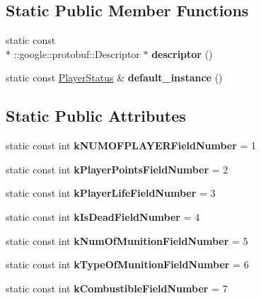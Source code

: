 \subsection*{Static Public Member Functions}
\begin{DoxyCompactItemize}
\item 
\hypertarget{class_player_status_ab7af70a3b8976e2a2971f67dd88d2ee0}{static const \\*
\-::google\-::protobuf\-::\-Descriptor $\ast$ {\bfseries descriptor} ()}\label{class_player_status_ab7af70a3b8976e2a2971f67dd88d2ee0}

\item 
\hypertarget{class_player_status_a48e587242903b11af6171a3307bdac91}{static const \hyperlink{class_player_status}{Player\-Status} \& {\bfseries default\-\_\-instance} ()}\label{class_player_status_a48e587242903b11af6171a3307bdac91}

\end{DoxyCompactItemize}
\subsection*{Static Public Attributes}
\begin{DoxyCompactItemize}
\item 
\hypertarget{class_player_status_a1420e7c20cf4424d3c25d4774f3b02a3}{static const int {\bfseries k\-N\-U\-M\-O\-F\-P\-L\-A\-Y\-E\-R\-Field\-Number} = 1}\label{class_player_status_a1420e7c20cf4424d3c25d4774f3b02a3}

\item 
\hypertarget{class_player_status_acf4acbabe53753e3554a06ef928683a0}{static const int {\bfseries k\-Player\-Points\-Field\-Number} = 2}\label{class_player_status_acf4acbabe53753e3554a06ef928683a0}

\item 
\hypertarget{class_player_status_a335a1328cd6c4be06ecb9c13e6ea9abf}{static const int {\bfseries k\-Player\-Life\-Field\-Number} = 3}\label{class_player_status_a335a1328cd6c4be06ecb9c13e6ea9abf}

\item 
\hypertarget{class_player_status_aa4c5235c27c896e7f2723c6c74a218a4}{static const int {\bfseries k\-Is\-Dead\-Field\-Number} = 4}\label{class_player_status_aa4c5235c27c896e7f2723c6c74a218a4}

\item 
\hypertarget{class_player_status_a1652b02aee1015ef64aeb10192344360}{static const int {\bfseries k\-Num\-Of\-Munition\-Field\-Number} = 5}\label{class_player_status_a1652b02aee1015ef64aeb10192344360}

\item 
\hypertarget{class_player_status_a5afa1140c6bf97e7a35b8c15a529022e}{static const int {\bfseries k\-Type\-Of\-Munition\-Field\-Number} = 6}\label{class_player_status_a5afa1140c6bf97e7a35b8c15a529022e}

\item 
\hypertarget{class_player_status_a79b1d6540d45cbfb5f2597a4321a139c}{static const int {\bfseries k\-Combustible\-Field\-Number} = 7}\label{class_player_status_a79b1d6540d45cbfb5f2597a4321a139c}

\end{DoxyCompactItemize}
